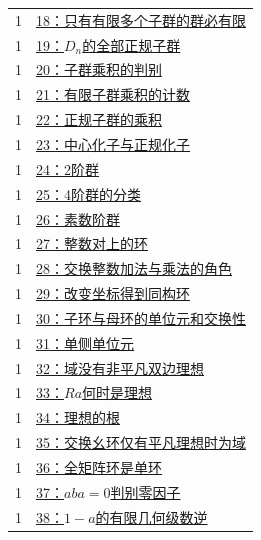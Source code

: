 \documentclass[UTF8,a4paper,11pt,fontset=windows]{ctexart}
\begin{document}
\begin{longtable}{cp{13.5cm}}
1 & \hyperref[ex:1:18]{18：只有有限多个子群的群必有限}\\

1 & \hyperref[ex:1:19]{19：$D_n$的全部正规子群}\\

1 & \hyperref[ex:1:20]{20：子群乘积的判别}\\

1 & \hyperref[ex:1:21]{21：有限子群乘积的计数}\\

1 & \hyperref[ex:1:22]{22：正规子群的乘积}\\

1 & \hyperref[ex:1:23]{23：中心化子与正规化子}\\

1 & \hyperref[ex:1:24]{24：2阶群}\\

1 & \hyperref[ex:1:25]{25：4阶群的分类}\\

1 & \hyperref[ex:1:26]{26：素数阶群}\\

1 & \hyperref[ex:1:27]{27：整数对上的环}\\

1 & \hyperref[ex:1:28]{28：交换整数加法与乘法的角色}\\

1 & \hyperref[ex:1:29]{29：改变坐标得到同构环}\\

1 & \hyperref[ex:1:30]{30：子环与母环的单位元和交换性}\\

1 & \hyperref[ex:1:31]{31：单侧单位元}\\

1 & \hyperref[ex:1:32]{32：域没有非平凡双边理想}\\

1 & \hyperref[ex:1:33]{33：$Ra$何时是理想}\\

1 & \hyperref[ex:1:34]{34：理想的根}\\

1 & \hyperref[ex:1:35]{35：交换幺环仅有平凡理想时为域}\\

1 & \hyperref[ex:1:36]{36：全矩阵环是单环}\\

1 & \hyperref[ex:1:37]{37：$aba=0$判别零因子}\\

1 & \hyperref[ex:1:38]{38：$1-a$的有限几何级数逆}\\


\end{longtable}
\end{document}

